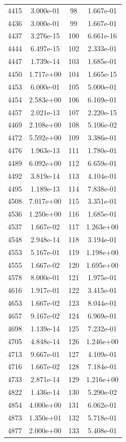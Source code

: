 \documentclass[12pt]{article}
\begin{document}
\begin{longtable}{@{}cccc@{}}
4415 & 3.000e-01 & 98 & 1.667e-01 \\
4436 & 3.000e-01 & 99 & 1.667e-01 \\
4437 & 3.276e-15 & 100 & 6.661e-16 \\
4444 & 6.497e-15 & 102 & 2.333e-01 \\
4447 & 1.739e-14 & 103 & 1.685e-01 \\
4450 & 1.717e+00 & 104 & 1.665e-15 \\
4453 & 6.000e-01 & 105 & 5.000e-01 \\
4454 & 2.583e+00 & 106 & 6.169e-01 \\
4457 & 2.021e-13 & 107 & 2.220e-15 \\
4469 & 2.108e+00 & 108 & 5.106e-02 \\
4472 & 5.592e+00 & 109 & 3.386e-01 \\
4476 & 1.963e-13 & 111 & 1.780e-01 \\
4489 & 6.092e+00 & 112 & 6.659e-01 \\
4492 & 3.819e-14 & 113 & 4.104e-01 \\
4495 & 1.189e-13 & 114 & 7.838e-01 \\
4508 & 7.017e+00 & 115 & 3.351e-01 \\
4536 & 1.250e+00 & 116 & 1.685e-01 \\
4537 & 1.667e-02 & 117 & 1.263e+00 \\
4548 & 2.948e-14 & 118 & 3.194e-01 \\
4553 & 5.167e-01 & 119 & 1.198e+00 \\
4555 & 1.667e-02 & 120 & 1.695e+00 \\
4578 & 8.000e-01 & 121 & 1.975e-01 \\
4616 & 1.917e-01 & 122 & 3.415e-01 \\
4653 & 1.667e-02 & 123 & 8.044e-01 \\
4657 & 9.167e-02 & 124 & 6.969e-01 \\
4698 & 1.139e-14 & 125 & 7.232e-01 \\
4705 & 4.848e-14 & 126 & 1.246e+00 \\
4713 & 9.667e-01 & 127 & 4.109e-01 \\
4716 & 1.667e-02 & 128 & 7.184e-01 \\
4733 & 2.871e-14 & 129 & 1.216e+00 \\
4822 & 1.436e-14 & 130 & 5.290e-02 \\
4854 & 4.000e+00 & 131 & 6.062e-01 \\
4873 & 1.350e+01 & 132 & 5.718e-01 \\
4877 & 2.000e+00 & 133 & 5.408e-01 \\

\end{longtable}
\end{document}
